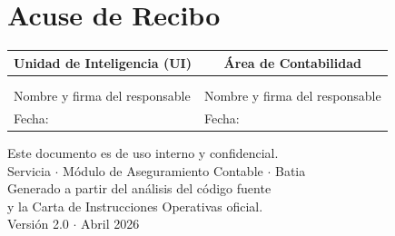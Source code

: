 \documentclass[12pt,a4paper]{article}
\begin{document}
\newpage

\section{Acuse de Recibo}

\vspace{1cm}

\begin{table}[h!]
\centering
\begin{tabularx}{\textwidth}{XX}
\toprule
\multicolumn{1}{c}{\textbf{Unidad de Inteligencia (UI)}} &
\multicolumn{1}{c}{\textbf{\'Area de Contabilidad}} \\
\midrule
& \\[1.8cm]
\underline{\hspace{6cm}} & \underline{\hspace{6cm}} \\
Nombre y firma del responsable & Nombre y firma del responsable \\[0.5cm]
Fecha: \underline{\hspace{3cm}} & Fecha: \underline{\hspace{3cm}} \\[0.5cm]
\bottomrule
\end{tabularx}
\end{table}

\vspace{2cm}

\begin{center}
{\small\color{gray}
Este documento es de uso interno y confidencial.\\
Servicia $\cdot$ M\'odulo de Aseguramiento Contable $\cdot$ Batia\\[0.2cm]
Generado a partir del an\'alisis del c\'odigo fuente\\
y la Carta de Instrucciones Operativas oficial.\\[0.2cm]
Versi\'on 2.0 $\cdot$ Abril 2026
}
\end{center}
\end{document}
